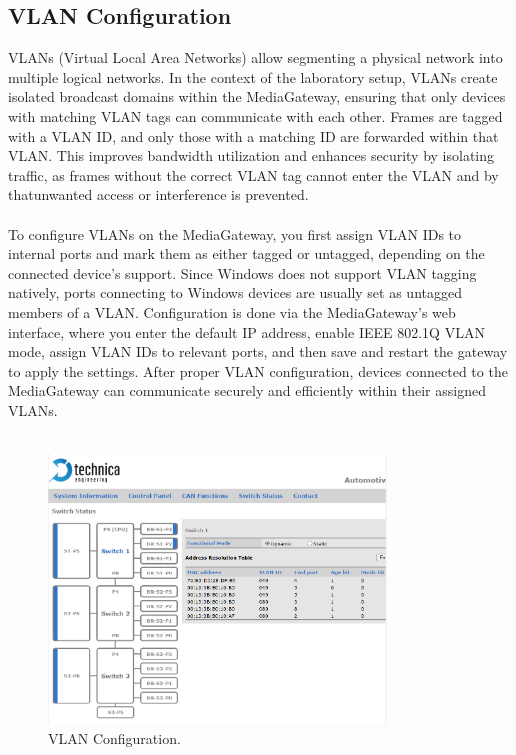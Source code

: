 \subsection{VLAN Configuration}
VLANs (Virtual Local Area Networks) allow segmenting a physical network into multiple logical networks. In the context of the laboratory setup, VLANs create isolated broadcast domains within the MediaGateway, ensuring that only devices with matching VLAN tags can communicate with each other. Frames are tagged with a VLAN ID, and only those with a matching ID are forwarded within that VLAN. This improves bandwidth utilization and enhances security by isolating traffic, as frames without the correct VLAN tag cannot enter the VLAN and by thatunwanted access or interference is prevented.\\\\
To configure VLANs on the MediaGateway, you first assign VLAN IDs to internal ports and mark them as either tagged or untagged, depending on the connected device’s support. Since Windows does not support VLAN tagging natively, ports connecting to Windows devices are usually set as untagged members of a VLAN. Configuration is done via the MediaGateway’s web interface, where you enter the default IP address, enable IEEE 802.1Q VLAN mode, assign VLAN IDs to relevant ports, and then save and restart the gateway to apply the settings. After proper VLAN configuration, devices connected to the MediaGateway can communicate securely and efficiently within their assigned VLANs.\\\\
\begin{figure}[h]
    \centering
     \includegraphics[width=0.8\textwidth]{figures/pictures/vlanconfig.PNG}
    \caption{VLAN Configuration.}
    \label{fig:mediagateway_setup3}
\end{figure}
